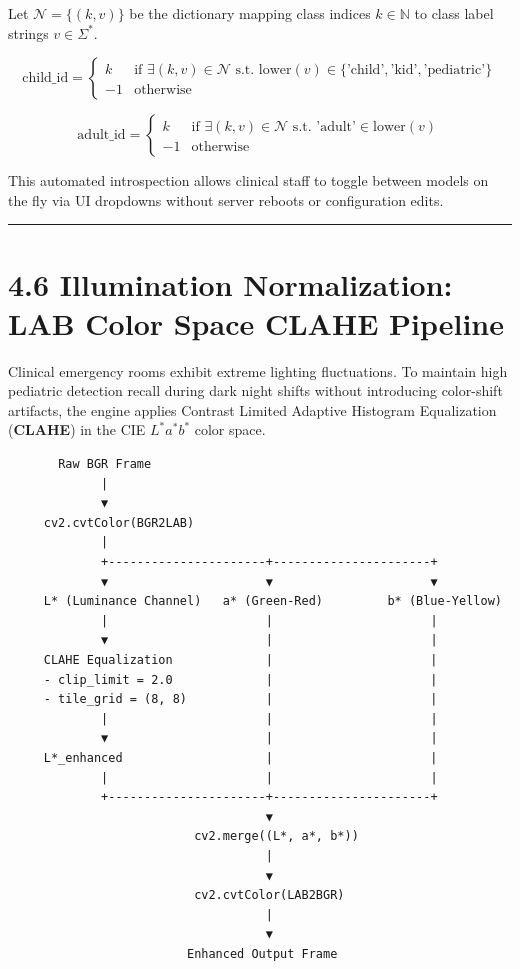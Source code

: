 Let \(\mathcal{N} = \{ (k, v) \}\) be the dictionary mapping class
indices \(k \in \mathbb{N}\) to class label strings \(v \in \Sigma^*\).

\[\text{child\_id} = \begin{cases} k & \text{if } \exists (k, v) \in \mathcal{N} \text{ s.t. } \text{lower}(v) \in \{\text{'child'}, \text{'kid'}, \text{'pediatric'}\} \\ -1 & \text{otherwise} \end{cases}\]

\[\text{adult\_id} = \begin{cases} k & \text{if } \exists (k, v) \in \mathcal{N} \text{ s.t. } \text{'adult'} \in \text{lower}(v) \\ -1 & \text{otherwise} \end{cases}\]

This automated introspection allows clinical staff to toggle between
models on the fly via UI dropdowns without server reboots or
configuration edits.

\begin{center}\rule{0.5\linewidth}{0.5pt}\end{center}

\section{4.6 Illumination Normalization: LAB Color Space CLAHE
Pipeline}\label{illumination-normalization-lab-color-space-clahe-pipeline}

Clinical emergency rooms exhibit extreme lighting fluctuations. To
maintain high pediatric detection recall during dark night shifts
without introducing color-shift artifacts, the engine applies Contrast
Limited Adaptive Histogram Equalization (\textbf{CLAHE}) in the CIE
\(L^*a^*b^*\) color space.

\begin{verbatim}
       Raw BGR Frame
             |
             ▼
     cv2.cvtColor(BGR2LAB)
             |
             +----------------------+----------------------+
             ▼                      ▼                      ▼
     L* (Luminance Channel)   a* (Green-Red)         b* (Blue-Yellow)
             |                      |                      |
             ▼                      |                      |
     CLAHE Equalization             |                      |
     - clip_limit = 2.0             |                      |
     - tile_grid = (8, 8)           |                      |
             |                      |                      |
             ▼                      |                      |
     L*_enhanced                    |                      |
             |                      |                      |
             +----------------------+----------------------+
                                    ▼
                          cv2.merge((L*, a*, b*))
                                    |
                                    ▼
                          cv2.cvtColor(LAB2BGR)
                                    |
                                    ▼
                         Enhanced Output Frame
\end{verbatim}

